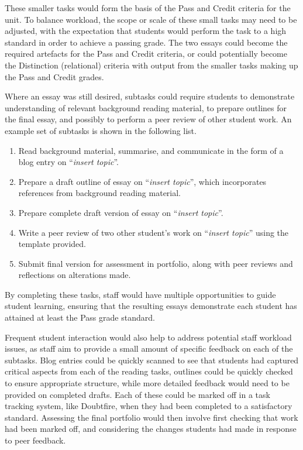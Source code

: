 These smaller tasks would form the basis of the Pass and Credit criteria for the unit. To balance workload, the scope or scale of these small tasks may need to be adjusted, with the expectation that students would perform the task to a high standard in order to achieve a passing grade. The two essays could become the required artefacts for the Pass and Credit criteria, or could potentially become the Distinction (relational) criteria with output from the smaller tasks making up the Pass and Credit grades.

Where an essay was still desired, subtasks could require students to demonstrate understanding of relevant background reading material, to prepare outlines for the final essay, and possibly to perform a peer review of other student work. An example set of subtasks is shown in the following list. 

\begin{enumerate}
	\item Read background material, summarise, and communicate in the form of a blog entry on ``\emph{insert topic}''.
	\item Prepare a draft outline of essay on ``\emph{insert topic}'', which incorporates references from background reading material.
	\item Prepare complete draft version of essay on ``\emph{insert topic}''.
	\item Write a peer review of two other student's work on ``\emph{insert topic}'' using the template provided. 
	\item Submit final version for assessment in portfolio, along with peer reviews and reflections on alterations made.
\end{enumerate}

By completing these tasks, staff would have multiple opportunities to guide student learning, ensuring that the resulting essays demonstrate each student has attained at least the Pass grade standard. 

Frequent student interaction would also help to address potential staff workload issues, as staff aim to provide a small amount of specific feedback on each of the subtasks. Blog entries could be quickly scanned to see that students had captured critical aspects from each of the reading tasks, outlines could be quickly checked to ensure appropriate structure, while more detailed feedback would need to be provided on completed drafts. Each of these could be marked off in a task tracking system, like Doubtfire, when they had been completed to a satisfactory standard. Assessing the final portfolio would then involve first checking that work had been marked off, and considering the changes students had made in response to peer feedback.

